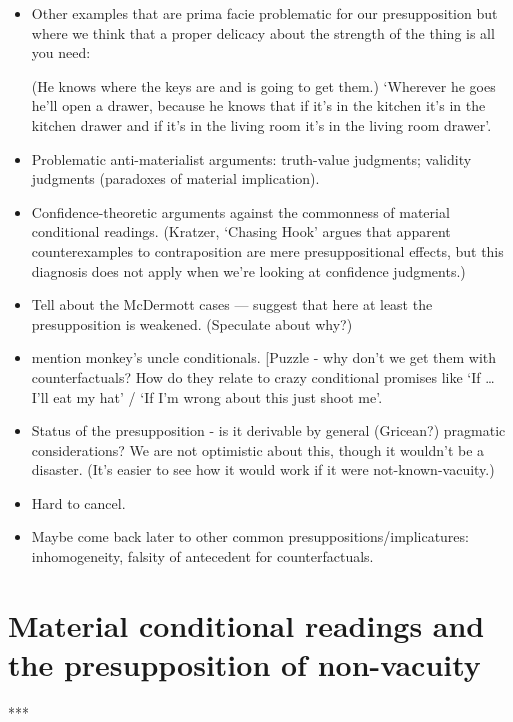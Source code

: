 \documentclass[If.tex]{subfiles}
\begin{document}
\begin{prop}
\begin{itemize}
	\item
	Other examples that are prima facie problematic for our presupposition but where we think that a proper delicacy about the strength of the thing is all you need:

 (He knows where the keys are and is going to get them.) ‘Wherever he goes he'll open a drawer, because he knows that if it's in the kitchen it's in the kitchen drawer and if it's in the living room it's in the living room drawer’.
	\item
	Problematic anti-materialist arguments: truth-value judgments; validity judgments (paradoxes of material implication).
	\item
	Confidence-theoretic arguments against the commonness of material conditional readings.  (Kratzer, ‘Chasing Hook’ argues that apparent counterexamples to contraposition are mere presuppositional effects, but this diagnosis does not apply when we're looking at confidence judgments.)
	\item
	Tell about the McDermott cases --- suggest that here at least the presupposition is weakened. (Speculate about why?)
	\item
	mention monkey's uncle conditionals. {[}Puzzle - why don't we get them with counterfactuals? How do they relate to crazy conditional promises like ‘If \ldots{} I'll eat my hat’ / ‘If I'm wrong about this just shoot me’.
	\item
	Status of the presupposition - is it derivable by general (Gricean?) pragmatic considerations? We are not optimistic about this, though it wouldn't be a disaster. (It's easier to see how it would work if it were not-known-vacuity.)
	\item
	Hard to cancel.
	\item
	Maybe come back later to other common presuppositions/implicatures: inhomogeneity, falsity of antecedent for counterfactuals. 
\end{itemize}

\section{Material conditional readings and the presupposition of non-vacuity}
\label{sect:material}
***


\end{prop}
\end{document}
